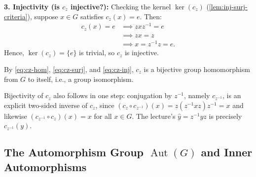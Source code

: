 \begin{proofWrapper}
\begin{content}
\textbf{3. Injectivity (is $c_z$ injective?):} Checking the kernel $\ker(c_z)$ (\cref{lem:inj-surj-criteria}), suppose $x \in G$ satisfies $c_z(x) = e$. Then:
\begin{align}
c_z(x) = e &\implies z x z^{-1} = e \nonumber \\
&\implies z x = z \nonumber \\
&\implies x = z^{-1} z = e. \label{eq:cz-inj}
\end{align}
Hence, $\ker(c_z) = \{e\}$ is trivial, so $c_z$ is injective.

By \eqref{eq:cz-hom}, \eqref{eq:cz-surj}, and \eqref{eq:cz-inj}, $c_z$ is a bijective group homomorphism from $G$ to itself, i.e., a group isomorphism.
\end{content}

\begin{aiNote}
Bijectivity of $c_z$ also follows in one step: conjugation by $z^{-1}$, namely $c_{z^{-1}}$, is an explicit two-sided inverse of $c_z$, since $(c_z \circ c_{z^{-1}})(x) = z (z^{-1} x z) z^{-1} = x$ and likewise $(c_{z^{-1}} \circ c_z)(x) = x$ for all $x \in G$. The lecture's $\hat{y} = z^{-1} y z$ is precisely $c_{z^{-1}}(y)$.
\end{aiNote}

\end{proofWrapper}

\subsection{The Automorphism Group \texorpdfstring{$\operatorname{Aut}(G)$}{Aut(G)} and Inner Automorphisms}

